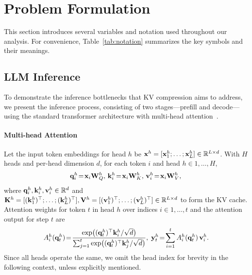 \section{Problem Formulation}

This section introduces several variables and notation used throughout our analysis. For convenience, Table~\ref{tab:notation} summarizes the key symbols and their meanings.

\subsection{LLM Inference}
\label{sec:inference_background}

To demonstrate the inference bottlenecks that KV compression aims to address, we present the inference process, consisting of two stages—prefill and decode—using the standard transformer architecture with multi-head attention~\cite{vaswani2017attention}.



\paragraph{Multi-head Attention} Let the input token embeddings for head $h$ be $\mathbf{x}^h=[\mathbf{x}_1^h;\dots;\mathbf{x}_L^h]\in\mathbb{R}^{L\times d}$. With $H$ heads and per-head dimension $d$, for each token $i$ and head $h\in{1,\dots,H}$,
\begin{equation}
\label{eq:qkv-proj}
    \mathbf{q}_i^h \!=\! \mathbf{x}_{i} \mathbf{W}_Q^h, \, \mathbf{k}_i^h \!=\! \mathbf{x}_{i} \mathbf{W}_K^h, \, \mathbf{v}_i^h \!=\! \mathbf{x}_{i} \mathbf{W}_V^h, \,
\end{equation}
where $\mathbf{q}_i^{h}, \mathbf{k}_i^h, \mathbf{v}_i^h \in \mathbb{R}^{d}$ and $\mathbf{K}^h=[(\mathbf{k}_1^h)^\top;\dots;(\mathbf{k}_L^h)^\top], \mathbf{V}^h=[(\mathbf{v}_1^h)^\top;\dots;(\mathbf{v}_L^h)^\top]\in\mathbb{R}^{L\times d}$ to form the KV cache. Attention weights for token $t$ in head $h$ over indices $i\in{1,\dots,t}$ and the attention output for step $t$ are
\begin{equation}
\label{eq:attn_eq}
    A_i^h(\mathbf{q}_t^h) \!=\! \frac{\exp\! \big((\mathbf{q}_t^{h})^\top \mathbf{k}_i^h/\sqrt d\big)}{\sum_{j=1}^{t}\exp\!\big((\mathbf{q}_t^{h})^\top \mathbf{k}_j^h/\sqrt d\big)}, \; 
    \mathbf{y}_t^h \!=\! \sum_{i=1}^{t} A_i^h(\mathbf{q}_t^h)\,\mathbf{v}_i^h .
\end{equation}
Since all heads operate the same, we omit the head index for brevity in the following context, unless explicitly mentioned.


